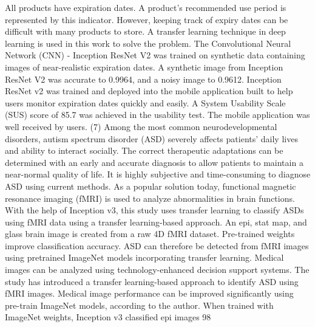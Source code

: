 \documentclass[conference]{IEEEtran}
\begin{document}
All products have expiration dates. A product's recommended use period is represented by this indicator. However, keeping track of expiry dates can be difficult with many products to store. A transfer learning technique in deep learning is used in this work to solve the problem. The Convolutional Neural Network (CNN) - Inception ResNet V2 was trained on synthetic data containing images of near-realistic expiration dates. A synthetic image from Inception ResNet V2 was accurate to 0.9964, and a noisy image to 0.9612. Inception ResNet v2 was trained and deployed into the mobile application built to help users monitor expiration dates quickly and easily. A System Usability Scale (SUS) score of 85.7 was achieved in the usability test. The mobile application was well received by users. (7) Among the most common neurodevelopmental disorders, autism spectrum disorder (ASD) severely affects patients' daily lives and ability to interact socially. The correct therapeutic adaptations can be determined with an early and accurate diagnosis to allow patients to maintain a near-normal quality of life. It is highly subjective and time-consuming to diagnose ASD using current methods. As a popular solution today, functional magnetic resonance imaging (fMRI) is used to analyze abnormalities in brain functions. With the help of Inception v3, this study uses transfer learning to classify ASDs using fMRI data using a transfer learning-based approach. An epi, stat map, and glass brain image is created from a raw 4D fMRI dataset. Pre-trained weights improve classification accuracy. ASD can therefore be detected from fMRI images using pretrained ImageNet models incorporating transfer learning. Medical images can be analyzed using technology-enhanced decision support systems. The study has introduced a transfer learning-based approach to identify ASD using fMRI images. Medical image performance can be improved significantly using pre-train ImageNet models, according to the author. When trained with ImageNet weights, Inception v3 classified epi images 98%
\end{document}
